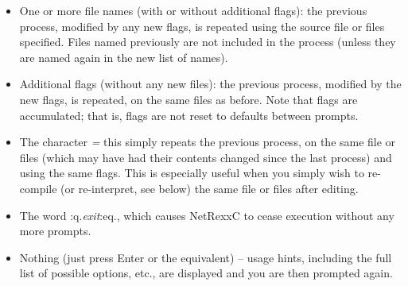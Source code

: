 \begin{itemize}
\item One or more file names (with or without additional flags): the previous
process, modified by any new flags, is repeated using the source file
or files specified.  Files named previously are not included in the
process (unless they are named again in the new list of names).
\item Additional flags (without any new files): the previous process, modified
by the new flags, is repeated, on the same files as before.
Note that flags are accumulated; that is, flags are not reset to
defaults between prompts.
\item The character \emph{=} this simply repeats the previous process,
on the same file or files (which may have had their contents changed
since the last process) and using the same flags.  This is especially
useful when you simply wish to re-compile (or re-interpret, see below)
the same file or files after editing.
\item
{}
The word :q.\emph{exit}:eq., which causes NetRexxC to cease execution
without any more prompts.
\item
Nothing (just press Enter or the equivalent) -- usage hints, including
the full list of possible options, etc., are displayed and you are then
prompted again.
\end{itemize}

